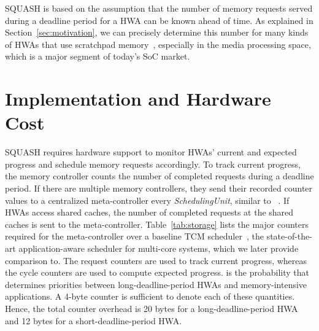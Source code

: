 \documentclass[10pt,letterpaper]{article}
\begin{document}
SQUASH is based on the assumption that the number of memory requests served
during a deadline period for a HWA can be known ahead of time. As explained in
Section~\ref{sec:motivation}, we can precisely determine this number for many
kinds of HWAs that use scratchpad
memory~\cite{resizing,HWA_sift,HWA_face,HWA_acoustic,mra}, especially in the
media processing space, which is a major segment of today's SoC market.
\fi




 \section{Implementation and Hardware Cost}

SQUASH requires hardware support to monitor HWAs' current and expected progress
and schedule memory requests accordingly. To track current progress, the memory
controller counts the number of completed requests during a deadline period. If
there are multiple memory controllers, they send their recorded counter values
to a centralized meta-controller every \emph{SchedulingUnit}, similar to
~\cite{atlas,tcm}. If HWAs access shared caches, the number of completed
requests at the shared caches is sent to the meta-controller.
Table~\ref{tab:storage} lists the major counters required for the
meta-controller over a baseline TCM scheduler~\cite{tcm}, the state-of-the-art
application-aware scheduler for multi-core systems, which we later
provide comparison to. The request counters are used to track current progress,
whereas the cycle counters are used to compute expected progress.  is the
probability that determines priorities between long-deadline-period HWAs and
memory-intensive applications. A 4-byte counter is sufficient to denote each of
these quantities. Hence, the total counter overhead is 20 bytes for a
long-deadline-period HWA and 12 bytes for a short-deadline-period HWA.
\end{document}
